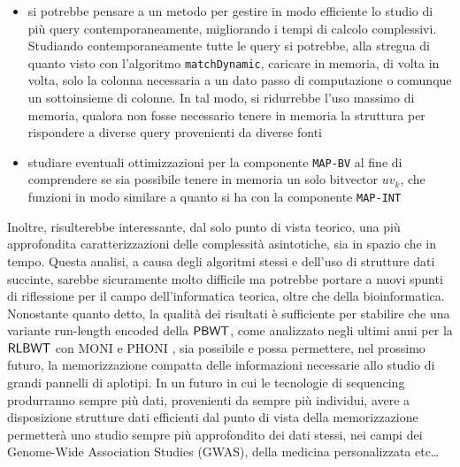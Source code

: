 \documentclass[a4paper,12pt, oneside]{book}
\newcommand{\dc}[1]{\todo[backgroundcolor=yellow]{\textbf{DC} #1}}
\def\RLBWT{\mbox{\rm {\sf RLBWT}}}
\def\PBWT{\mbox{\rm {\sf PBWT}}}
\begin{document}
\begin{itemize}
  \item si potrebbe pensare a un metodo per gestire in modo efficiente lo
  studio di più query contemporaneamente, migliorando i tempi di calcolo
  complessivi. Studiando contemporaneamente tutte le query si potrebbe, alla
  stregua di quanto visto con l'algoritmo \texttt{matchDynamic}, caricare in
  memoria, di volta in volta, solo la 
  colonna necessaria a un dato passo di computazione o comunque un sottoinsieme
  di colonne. In tal modo, si ridurrebbe l'uso massimo di memoria, qualora non
  fosse necessario tenere in memoria la struttura per rispondere a diverse query
  provenienti da diverse fonti
  \item studiare eventuali ottimizzazioni per la componente \texttt{MAP-BV} al
  fine di comprendere se sia possibile tenere in
  memoria un solo bitvector $uv_k$, che funzioni in modo similare a quanto si ha
  con la componente \texttt{MAP-INT}
\end{itemize}
Inoltre, risulterebbe interessante, dal solo punto di vista teorico, una più
approfondita caratterizzazioni delle complessità asintotiche, sia in spazio che
in tempo. Questa analisi, a causa degli algoritmi stessi e dell'uso di strutture
dati succinte, sarebbe sicuramente molto difficile ma potrebbe portare a nuovi
spunti di riflessione per il campo dell'informatica teorica, oltre che della
bioinformatica.\\
Nonostante quanto detto, la qualità dei risultati è sufficiente
per stabilire che una variante run-length encoded della $\PBWT$,
come analizzato negli ultimi anni per la $\RLBWT$ con
MONI \cite{moni} e PHONI \cite{phoni}, sia possibile e possa
permettere, nel prossimo futuro, la memorizzazione compatta delle informazioni
necessarie allo studio di grandi pannelli di aplotipi. In un futuro in cui le
tecnologie di sequencing produrranno sempre più dati, provenienti da sempre più
individui, avere a disposizione strutture dati efficienti dal punto di vista
della memorizzazione permetterà uno studio sempre più approfondito dei dati
stessi, nei campi dei Genome-Wide Association Studies (GWAS), della
medicina personalizzata etc\ldots 



% 
%
% 


\end{document}
